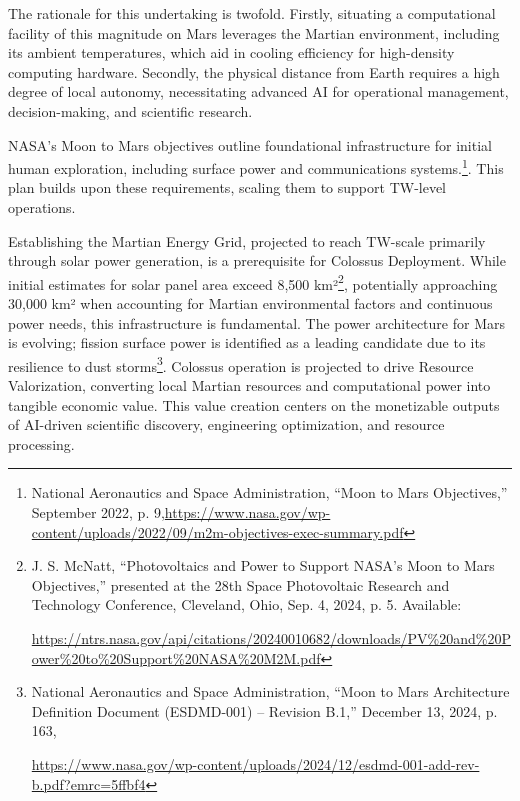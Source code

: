 \documentclass[fontsize=10pt, oneside, DIV=calc]{scrartcl}
\begin{document}
\medskip

\noindent
The rationale for this undertaking is twofold. Firstly, situating a computational facility of this magnitude on Mars leverages the Martian environment, including its ambient temperatures, which aid in cooling efficiency for high-density computing hardware. Secondly, the physical distance from Earth requires a high degree of local autonomy, necessitating advanced AI for operational management, decision-making, and scientific research. 

NASA's Moon to Mars objectives outline foundational infrastructure for initial human exploration, including surface power and communications systems.\footnote{National Aeronautics and Space Administration, ``Moon to Mars Objectives,'' September 2022, p. 9,\href{https://www.nasa.gov/wp-content/uploads/2022/09/m2m-objectives-exec-summary.pdf}\url{https://www.nasa.gov/wp-content/uploads/2022/09/m2m-objectives-exec-summary.pdf}}. This plan builds upon these requirements, scaling them to support TW-level operations.

\medskip

\noindent
Establishing the Martian Energy Grid, projected to reach TW-scale primarily through solar power generation, is a prerequisite for Colossus Deployment. While initial estimates for solar panel area exceed 8,500 km²\footnote{J. S. McNatt, ``Photovoltaics and Power to Support NASA’s Moon to Mars Objectives,'' presented at the 28th Space Photovoltaic Research and Technology Conference, Cleveland, Ohio, Sep. 4, 2024, p. 5. Available: 







\href{https://ntrs.nasa.gov/api/citations/20240010682/downloads/PV\%20and\%20Power\%20to\%20Support\%20NASA\%20M2M.pdf}\url{https://ntrs.nasa.gov/api/citations/20240010682/downloads/PV\%20and\%20Power\%20to\%20Support\%20NASA\%20M2M.pdf}}, potentially approaching 30,000 km² when accounting for Martian environmental factors and continuous power needs, this infrastructure is fundamental. The power architecture for Mars is evolving; fission surface power is identified as a leading candidate due to its resilience to dust storms\footnote{National Aeronautics and Space Administration, ``Moon to Mars Architecture Definition Document (ESDMD-001) – Revision B.1,'' December 13, 2024, p. 163, 







\href{https://www.nasa.gov/wp-content/uploads/2024/12/esdmd-001-add-rev-b.pdf?emrc=5ffbf4}\url{https://www.nasa.gov/wp-content/uploads/2024/12/esdmd-001-add-rev-b.pdf?emrc=5ffbf4}}. Colossus operation is projected to drive Resource Valorization, converting local Martian resources and computational power into tangible economic value. This value creation centers on the monetizable outputs of AI-driven scientific discovery, engineering optimization, and resource processing.
\end{document}
